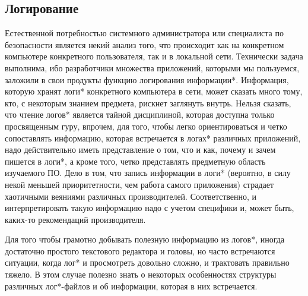 \subsection{Логирование}
\label{sec:analysis:log}
 
Естественной потребностью системного администратора или специалиста по безопасности является некий анализ того, что происходит как на конкретном компьютере конкретного пользователя, так и в локальной сети. Технически задача выполнима, ибо разработчики множества приложений, которыми мы пользуемся, заложили в свои продукты функцию логирования информации*. Информация, которую хранят логи* конкретного компьютера в сети, может сказать много тому, кто, с некоторым знанием предмета, рискнет заглянуть внутрь. Нельзя сказать, что чтение логов* является тайной дисциплиной, которая доступна только просвященным гуру, впрочем, для того, чтобы легко ориентироваться и четко сопоставлять информацию, которая встречается в логах* различных приложений, надо действительно иметь представление о том, что и как, почему и зачем пишется в логи*, а кроме того, четко представлять предметную область изучаемого ПО. Дело в том, что запись информации в логи* (вероятно, в силу некой меньшей приоритетности, чем работа самого приложения) страдает хаотичными веяниями различных производителей. Соответственно, и интерпретировать такую информацию надо с учетом специфики и, может быть, каких-то рекомендаций производителя.

Для того чтобы грамотно добывать полезную информацию из логов*, иногда достаточно простого текстового редактора и головы, но часто встречаются ситуации, когда лог* и просмотреть довольно сложно, и трактовать правильно тяжело. В этом случае полезно знать о некоторых особенностях структуры различных лог*-файлов и об информации, которая в них встречается.
